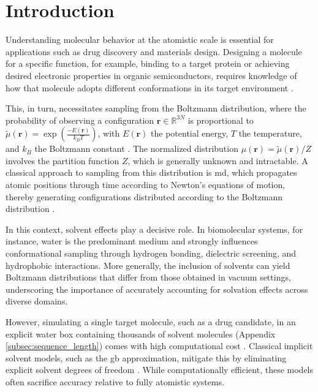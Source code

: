 
\section{Introduction}
\label{sec:introduction}



Understanding molecular behavior at the atomistic scale is essential for applications such as drug discovery and materials design. Designing a molecule for a specific function, for example, binding to a target protein or achieving desired electronic properties in organic semiconductors, requires knowledge of how that molecule adopts different conformations in its target environment \citep{de2016role, jorgensen2004many, hachmann2011harvard}.



This, in turn, necessitates sampling from the Boltzmann distribution, where the probability of observing a configuration $\mathbf{r} \in \mathbb{R}^{3N}$ is proportional to $\tilde{\mu}(\mathbf{r}) = \exp\left(\frac{-E(\mathbf{r})}{k_B T}\right)$, with $E(\mathbf{r})$ the potential energy, $T$ the temperature, and $k_B$ the Boltzmann constant \citep{frenkel2023understanding}. The normalized distribution $\mu(\mathbf{r}) = \tilde{\mu}(\mathbf{r})/Z$ involves the partition function $Z$, which is generally unknown and intractable. A classical approach to sampling from this distribution is \gls{md}, which propagates atomic positions through time according to Newton's equations of motion, thereby generating configurations distributed according to the Boltzmann distribution \citep{karplus2002molecular, hollingsworth2018molecular}.


In this context, solvent effects play a decisive role. In biomolecular systems, for instance, water is the predominant medium and strongly influences conformational sampling through hydrogen bonding, dielectric screening, and hydrophobic interactions. More generally, the inclusion of solvents can yield Boltzmann distributions that differ from those obtained in vacuum settings, underscoring the importance of accurately accounting for solvation effects across diverse domains. 

However, simulating a single target molecule, such as a drug candidate, in an explicit water box containing thousands of solvent molecules (Appendix \ref{subsec:sequence_length}) comes with high computational cost \citep{roux1999implicit, feig2004performance}. Classical implicit solvent models, such as the \gls{gb} approximation, mitigate this by eliminating explicit solvent degrees of freedom \citep{still1990semianalytical, Onufriev2019-yz}. While computationally efficient, these models often sacrifice accuracy relative to fully atomistic systems.


